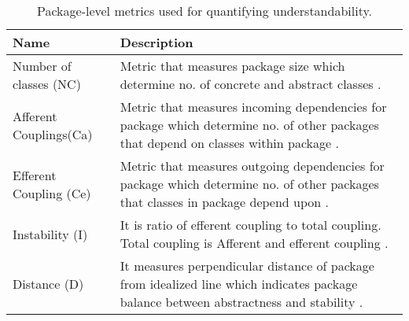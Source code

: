 \begin{table*}[t]
    \centering
    \begin{tabular}{p{4cm} p{12cm}}
        \toprule
            \textbf{Name} & \textbf{Description} \\
            
            \midrule
            Number of classes (NC) 	& Metric that measures package size which determine no. of concrete and abstract classes \cite{s68_understandability}. \\
            \midrule Afferent Couplings(Ca) & Metric that measures incoming dependencies for package which determine no. of other packages that depend on classes within package \cite{s68_understandability}. \\
            \midrule Efferent Coupling (Ce)	& Metric that measures outgoing dependencies for package which determine no. of other packages that classes in package depend upon \cite{s68_understandability, s116_maintainability}. \\
            \midrule
            Instability (I) 	& It is ratio of efferent coupling to total coupling. Total coupling is Afferent and efferent coupling \cite{s68_understandability}. \\
            \midrule
            Distance (D)	& It measures perpendicular distance of package from idealized line which indicates package balance between abstractness and stability \cite{s68_understandability}. \\
            
        \bottomrule
    \end{tabular}
    \caption{Package-level metrics used for quantifying understandability.}
    \label{table:understandability_metrics}
\end{table*}